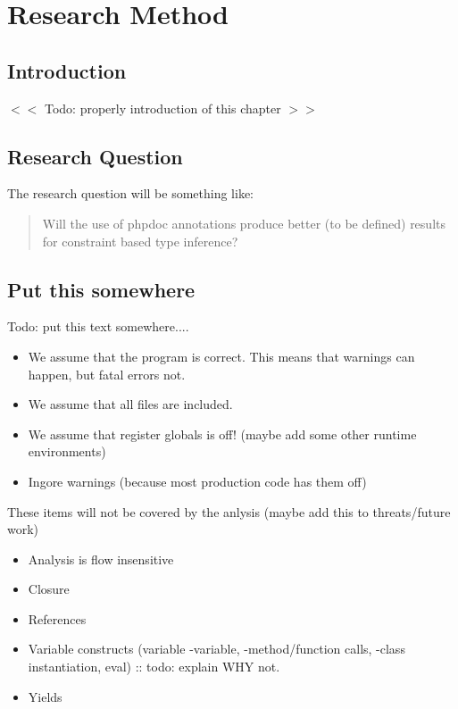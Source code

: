 \documentclass[../main.tex]{subfiles}
\begin{document}
    \chapter{Research Method}\label{chap:research_method}


    \section{Introduction}
    $<<$ Todo: properly introduction of this chapter $>>$
        
    
    
    \section{Research Question}
    The research question will be something like: \\
    \begin{quote}
        Will the use of phpdoc annotations produce better (to be defined) results for constraint based type inference?
    \end{quote}
    
    \section{Put this somewhere}
    Todo: put this text somewhere....
    \begin{itemize}
        \item We assume that the program is correct. This means that warnings can happen, but fatal errors not.
        \item We assume that all files are included.
        \item We assume that register globals is off! (maybe add some other runtime environments)
        \item Ingore warnings (because most production code has them off)
    \end{itemize}
    These items will not be covered by the anlysis (maybe add this to threats/future work)
    \begin{itemize}
        \item Analysis is flow insensitive
        \item Closure
        \item References
        \item Variable constructs (variable -variable, -method/function calls, -class instantiation, eval) :: todo: explain WHY not.
        \item Yields
        
    \end{itemize}
\end{document}
